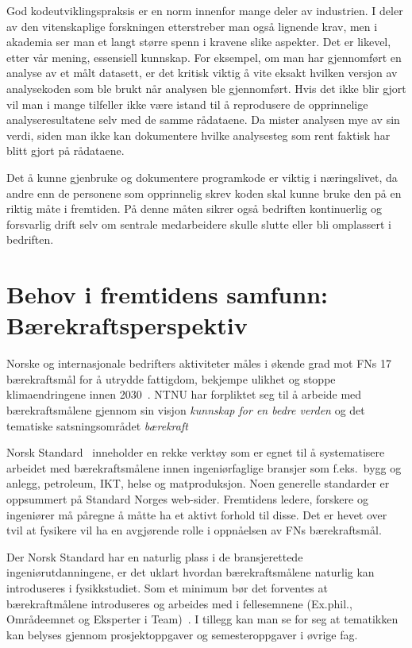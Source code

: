 \documentclass{article}
\begin{document}
God kodeutviklingspraksis er en norm innenfor mange deler av industrien. I deler av den vitenskaplige forskningen etterstreber man også lignende krav, men i akademia ser man et langt større spenn i kravene slike aspekter. Det er likevel, etter vår mening, essensiell kunnskap. For eksempel, om man har gjennomført en analyse av et målt datasett, er det kritisk viktig å vite eksakt hvilken versjon av analysekoden som ble brukt når analysen ble gjennomført. Hvis det ikke blir gjort vil man i mange tilfeller ikke være istand til å reprodusere de opprinnelige analyseresultatene selv med de samme rådataene. Da mister analysen mye av sin verdi, siden man ikke kan dokumentere hvilke analysesteg som rent faktisk har blitt gjort på rådataene.

Det å kunne gjenbruke og dokumentere programkode er viktig i næringslivet, da andre enn de personene som opprinnelig skrev koden skal kunne bruke den på en riktig måte i fremtiden. På denne måten sikrer også bedriften kontinuerlig og forsvarlig drift selv om sentrale medarbeidere skulle slutte eller bli omplassert i bedriften.

\section{Behov i fremtidens samfunn: Bærekraftsperspektiv}
\label{sec:behov-bkraft}
Norske og internasjonale bedrifters aktiviteter måles i økende grad mot FNs 17 bærekraftsmål for å utrydde fattigdom, bekjempe ulikhet og stoppe klimaendringene innen 2030~\cite{FNsustgoals}.
NTNU har forpliktet seg til å arbeide med bærekraftsmålene gjennom sin visjon \emph{kunnskap for en bedre verden} og det tematiske satsningsområdet \emph{bærekraft}~\cite{NTNUStrategi,NTNUBaerekraftMaal,NTNUBaerekraft}

Norsk Standard~\cite{StandardNorge} inneholder en rekke verktøy som er egnet til å systematisere arbeidet med bærekraftsmålene innen ingeniørfaglige bransjer som f.eks.~bygg og anlegg, petroleum, IKT, helse og matproduksjon.
Noen generelle standarder er oppsummert på Standard Norges web-sider.
Fremtidens ledere, forskere og ingeniører må påregne å måtte ha et aktivt forhold til disse.
Det er hevet over tvil at fysikere vil ha en avgjørende rolle i oppnåelsen av FNs bærekraftsmål.

Der Norsk Standard har en naturlig plass i de bransjerettede ingeniørutdanningene, er det uklart hvordan bærekraftsmålene naturlig kan introduseres i fysikkstudiet.
Som et minimum bør det forventes at bærekraftmålene introduseres og arbeides med i fellesemnene (Ex.phil., Områdeemnet og Eksperter i Team)~\cite{NTNUFellesEmner}.
I tillegg kan man se for seg at tematikken kan belyses gjennom prosjektoppgaver og semesteroppgaver i øvrige fag.
\end{document}
